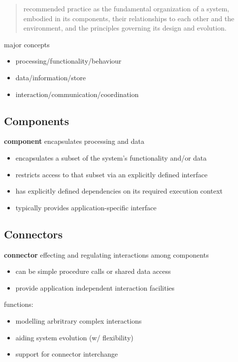 \documentclass[]{article}
\theoremstyle{definition}
\begin{document}
	\begin{quote}
	recommended practice as the fundamental organization of a system, embodied in its components, their relationships to each other and the environment, and the principles governing its design and evolution. 
	\end{quote}

	major concepts
	\begin{itemize}
		\item processing/functionality/behaviour
		\item data/information/store
		\item interaction/communication/coordination
	\end{itemize}
	
	\subsection{Components}
	\textbf{component} encapsulates processing and data
	\begin{itemize}
		\item encapsulates a subset of the system's functionality and/or data
		\item restricts access to that subset via an explicitly defined interface
		\item has explicitly defined dependencies on its required execution context
		\item typically provides application-specific interface
	\end{itemize}

	\subsection{Connectors}
	\textbf{connector} effecting and regulating interactions among components
	\begin{itemize}
		\item can be simple procedure calls or shared data access
		\item provide application independent interaction facilities
	\end{itemize}
	functions:
	\begin{itemize}
		\item modelling arbritrary complex interactions
		\item aiding system evolution (w/ flexibility)
		\item support for connector interchange 
	\end{itemize}
\end{document}
